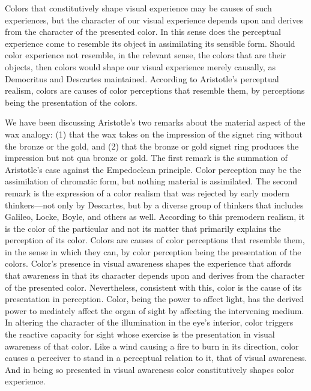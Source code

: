 Colors that constitutively shape visual experience may be causes of such experiences, but the character of our visual experience depends upon and derives from the character of the presented color. In this sense does the perceptual experience come to resemble its object in assimilating its sensible form. Should color experience not resemble, in the relevant sense, the colors that are their objects, then colors would shape our visual experience merely causally, as Democritus and Descartes maintained. According to Aristotle's perceptual realism, colors are causes of color perceptions that resemble them, by perceptions being the presentation of the colors.

We have been discussing Aristotle's two remarks about the material aspect of the wax analogy: (1) that the wax takes on the impression of the signet ring without the bronze or the gold, and (2) that the bronze or gold signet ring produces the impression but not qua bronze or gold. The first remark is the summation of Aristotle's case against the Empedoclean principle. Color perception may be the assimilation of chromatic form, but nothing material is assimilated. The second remark is the expression of a color realism that was rejected by early modern thinkers---not only by Descartes, but by a diverse group of thinkers that includes Galileo, Locke, Boyle, and others as well. According to this premodern realism, it is the color of the particular and not its matter that primarily explains the perception of its color. Colors are causes of color perceptions that resemble them, in the sense in which they can, by color perception being the presentation of the colors. Color's presence in visual awareness shapes the experience that affords that awareness in that its character depends upon and derives from the character of the presented color. Nevertheless, consistent with this, color is the cause of its presentation in perception. Color, being the power to affect light, has the derived power to mediately affect the organ of sight by affecting the intervening medium. In altering the character of the illumination in the eye's interior, color triggers the reactive capacity for sight whose exercise is the presentation in visual awareness of that color. Like a wind causing a fire to burn in its direction, color causes a perceiver to stand in a perceptual relation to it, that of visual awareness. And in being so presented in visual awareness color constitutively shapes color experience.


